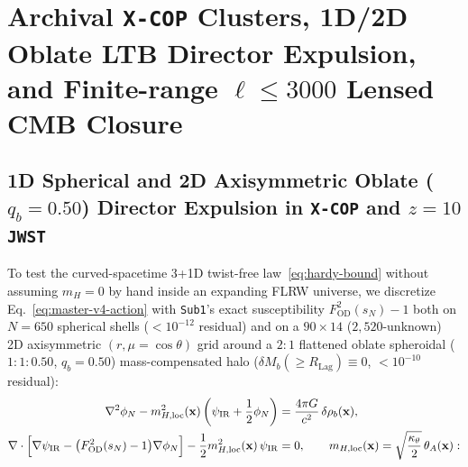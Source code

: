 \documentclass[11pt,a4paper]{article}
\begin{document}
\section{Archival \texttt{X-COP} Clusters, 1D/2D Oblate LTB Director Expulsion, and Finite-range \texorpdfstring{$\ell \le 3000$}{l <= 3000} Lensed CMB Closure}
\label{sec:boltzmann-ee}

\subsection{1D Spherical and 2D Axisymmetric Oblate (\texorpdfstring{$q_b = 0.50$}{q\_b = 0.50}) Director Expulsion in \texttt{X-COP} and \texorpdfstring{$z = 10$}{z = 10} \texttt{JWST}}
To test the curved-spacetime 3+1D twist-free law~\eqref{eq:hardy-bound} without assuming $m_H = 0$ by hand inside an expanding FLRW universe, we discretize Eq.~\eqref{eq:master-v4-action} with {\upshape\texttt{Sub1}}'s exact susceptibility $F_{\mathrm{OD}}^2(s_N) - 1$ both on $N = 650$ spherical shells ($< 10^{-12}$ residual) and on a $90\times 14$ ($2{,}520$-unknown) 2D axisymmetric $(r, \mu = \cos\theta)$ grid around a $2\!:\!1$ flattened oblate spheroidal ($1\!:\!1\!:\!0.50$, $q_b = 0.50$) mass-compensated halo ($\delta M_b(\ge R_{\mathrm{Lag}}) \equiv 0$, $< 10^{-10}$ residual):
\begin{equation}
\begin{aligned}
  \nabla^2\phi_N - m_{H,\mathrm{loc}}^2(\mathbf{x})\left(\psi_{\mathrm{IR}} + \frac{1}{2}\phi_N\right) &= \frac{4\pi G}{c^2}\,\delta\rho_b(\mathbf{x}), \\
  \nabla\cdot\Bigl[\nabla\psi_{\mathrm{IR}} - \bigl(F_{\mathrm{OD}}^2(s_N) - 1\bigr)\nabla\phi_N\Bigr] - \frac{1}{2}m_{H,\mathrm{loc}}^2(\mathbf{x})\,\psi_{\mathrm{IR}} &= 0, \qquad m_{H,\mathrm{loc}}(\mathbf{x}) = \sqrt{\frac{\kappa_\theta}{2}}\,\theta_A(\mathbf{x}):
\end{aligned}
\label{eq:ltb-bvp}
\end{equation}
\end{document}
